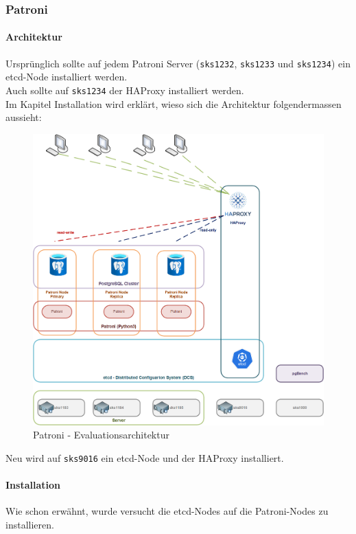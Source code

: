 
\begin{flushleft}
    \subsubsection{Patroni}
    \paragraph{Architektur}
    Ursprünglich sollte auf jedem Patroni Server (\texttt{sks1232}, \texttt{sks1233} und \texttt{sks1234}) ein \gls{etcd}-Node installiert werden.\\
    Auch sollte auf \texttt{sks1234} der \Gls{HAProxy} installiert werden.\\
    Im Kapitel Installation wird erklärt, wieso sich die Architektur folgendermassen aussieht:
    \begin{figure}[H]
        \centering
        \includegraphics[width=0.8\linewidth]{source/implementation/evaluation/postgresql_ha_solutions/patroni/patroni-evaluation-architecture}
        \caption{Patroni - Evaluationsarchitektur}
        \label{fig:patroni-evaluation-architecture.png}
    \end{figure}
    Neu wird auf \texttt{sks9016} ein \gls{etcd}-Node und der \Gls{HAProxy} installiert.
\end{flushleft}
\begin{flushleft}
    \paragraph{Installation}
    Wie schon erwähnt, wurde versucht die \gls{etcd}-Nodes auf die Patroni-Nodes zu installieren.
\end{flushleft}
